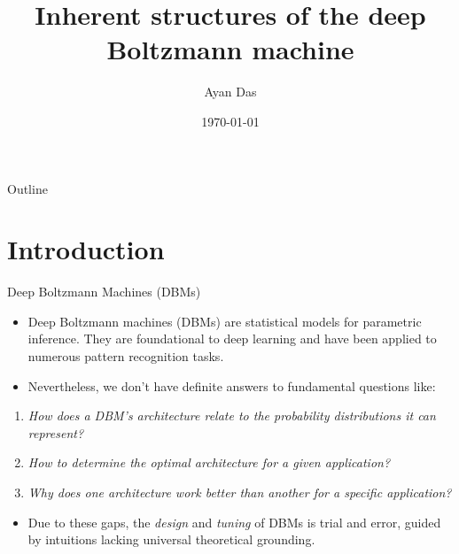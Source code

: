 \documentclass[8pt]{beamer}
\title{Inherent structures of the deep Boltzmann machine}
\date{\today}
\author{Ayan Das}
\institute{Indian Institute of Science (IISc), Bengaluru}
\begin{document}
\maketitle

\begin{frame}{Outline}
\tableofcontents
\end{frame}

\section{Introduction}
\label{sec:orgf569f0a}

\begin{frame}[label={sec:org101ecb5}]{Deep Boltzmann Machines (DBMs)}
\begin{itemize}
\item \alert{Deep Boltzmann machines} (DBMs) \cite{salakhutdinov2009deep} are statistical models for parametric inference. They are foundational to deep learning and have been applied to numerous pattern recognition tasks.
\item Nevertheless, we don't have definite answers to fundamental questions like:
\end{itemize}
\begin{enumerate}
\item \emph{How does a DBM's architecture relate to the probability distributions it can represent?}
\linebreak
\item \emph{How to determine the optimal architecture for a given application?}
\linebreak
\item \emph{Why does one architecture work better than another for a specific application?}
\linebreak
\end{enumerate}
\begin{itemize}
\item Due to these gaps, the \emph{design} and \emph{tuning} of DBMs is trial and error, guided by intuitions lacking universal theoretical grounding.
\end{itemize}
\end{frame}
\end{document}
